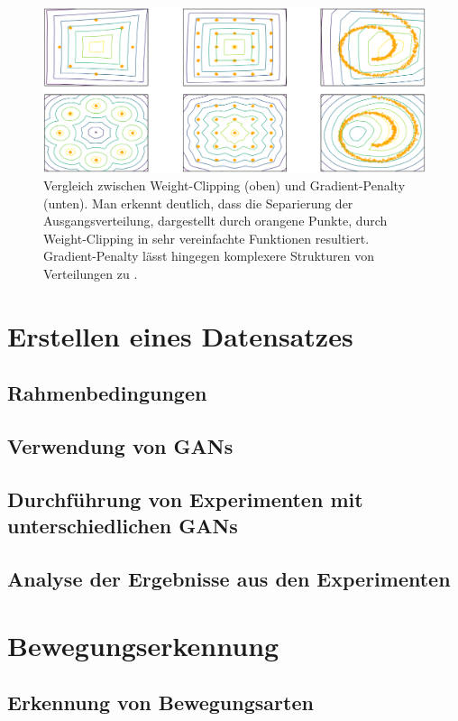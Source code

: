 \documentclass{hsflensburg}
\begin{document}
  \begin{figure}
    \centering
    \includegraphics[width=\textwidth]{images/problems_of_weight_clipping}
    \caption{Vergleich zwischen Weight-Clipping (oben) und Gradient-Penalty
    (unten). Man erkennt deutlich, dass die Separierung der Ausgangsverteilung,
    dargestellt durch orangene Punkte, durch Weight-Clipping in sehr
    vereinfachte Funktionen resultiert. Gradient-Penalty lässt hingegen
    komplexere Strukturen von Verteilungen zu \cite{gulrajani2017improved}.}
    \label{fig:problems-of-weight-clipping}
  \end{figure}

  \chapter{Erstellen eines Datensatzes}\label{chapter:dataset}
  \section{Rahmenbedingungen}
  \section{Verwendung von GANs}
  \section{Durchführung von Experimenten mit unterschiedlichen GANs}
  \section{Analyse der Ergebnisse aus den Experimenten}

  \chapter{Bewegungserkennung}\label{chapter:motion-detection}
  \section{Erkennung von Bewegungsarten}
\end{document}
